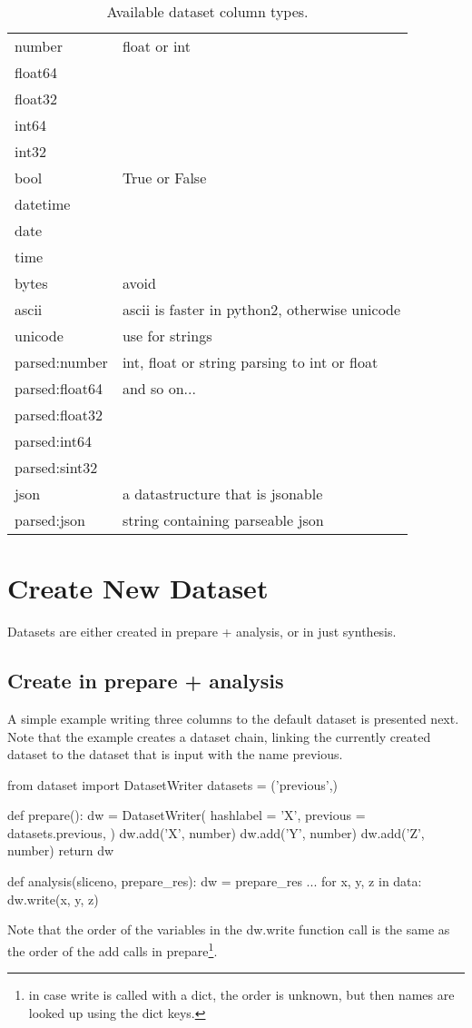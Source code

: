 \begin{table}[h!]
 \begin{tabular}{ll}
  \hline
    number   &  float or int\\
    float64   &\\
    float32   &\\
    int64   & \\
    int32   &  \\
    bool   &  True or False\\
    datetime   &  \\
    date   &  \\
    time   &  \\
    bytes   &  avoid \\
    ascii   &  ascii is faster in python2, otherwise unicode\\
    unicode   &  use for strings\\
    parsed:number   & int, float or string parsing to int or float \\
    parsed:float64   &  and so on...\\
    parsed:float32   &  \\
    parsed:int64   &  \\
    parsed:sint32   &  \\
    json   &  a datastructure that is jsonable\\
    parsed:json   &  string containing parseable json\\
  \hline
 \end{tabular}
 \caption{Available dataset column types.}
\end{table}

\newpage
\section{Create New Dataset}
Datasets are either created in prepare + analysis, or in just
synthesis.

\subsection{Create in prepare + analysis}
A simple example writing three columns to the default dataset is
presented next.  Note that the example creates a dataset chain,
linking the currently created dataset to the dataset that is input
with the name previous.

\begin{python}
from dataset import DatasetWriter
datasets = ('previous',)

def prepare():
  dw = DatasetWriter(
    hashlabel = 'X',
    previous = datasets.previous,
  )
  dw.add('X', number)
  dw.add('Y', number)
  dw.add('Z', number)
  return dw

def analysis(sliceno, prepare_res):
  dw = prepare_res
  ...
  for x, y, z in data:
    dw.write(x, y, z)
\end{python}
Note that the order of the variables in the dw.write function call is
the same as the order of the add calls in prepare\footnote{in case
  write is called with a dict, the order is unknown, but then names
  are looked up using the dict keys.}.

